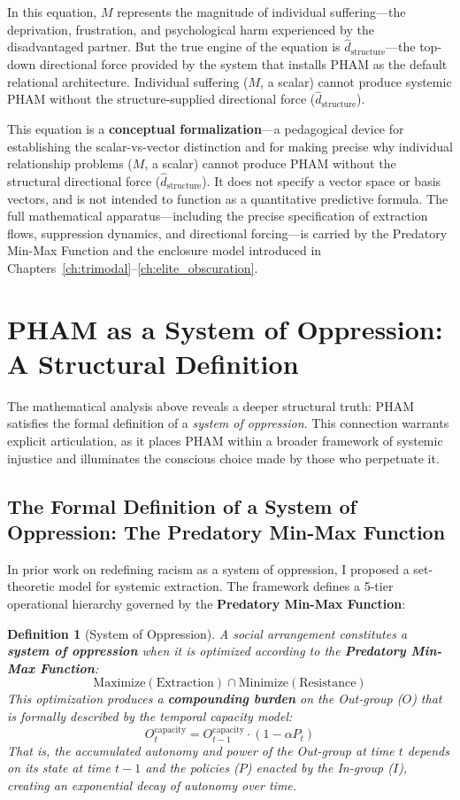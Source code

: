 \documentclass[12pt,openany]{book}
\newtheorem{definition}{Definition}[chapter]
\numberwithin{equation}{chapter}
\begin{document}
In this equation, $M$ represents the magnitude of individual suffering---the deprivation, frustration, and psychological harm experienced by the disadvantaged partner. But the true engine of the equation is $\hat{d}_{\text{structure}}$---the top-down directional force provided by the system that installs PHAM as the default relational architecture. Individual suffering ($M$, a scalar) cannot produce systemic PHAM without the structure-supplied directional force ($\hat{d}_{\text{structure}}$).

This equation is a \textbf{conceptual formalization}---a pedagogical device for establishing the scalar-vs-vector distinction and for making precise why individual relationship problems ($M$, a scalar) cannot produce PHAM without the structural directional force ($\hat{d}_{\text{structure}}$). It does not specify a vector space or basis vectors, and is not intended to function as a quantitative predictive formula. The full mathematical apparatus---including the precise specification of extraction flows, suppression dynamics, and directional forcing---is carried by the Predatory Min-Max Function and the enclosure model introduced in Chapters~\ref{ch:trimodal}--\ref{ch:elite_obscuration}.

\section{PHAM as a System of Oppression: A Structural Definition}

The mathematical analysis above reveals a deeper structural truth: PHAM satisfies the formal definition of a \textit{system of oppression}. This connection warrants explicit articulation, as it places PHAM within a broader framework of systemic injustice and illuminates the conscious choice made by those who perpetuate it.

\subsection{The Formal Definition of a System of Oppression: The Predatory Min-Max Function}

In prior work on redefining racism as a system of oppression, I proposed a set-theoretic model for systemic extraction. The framework defines a 5-tier operational hierarchy governed by the \textbf{Predatory Min-Max Function}:

\begin{definition}[System of Oppression]
A social arrangement constitutes a \textbf{system of oppression} when it is optimized according to the \textbf{Predatory Min-Max Function}:
\[
\text{Maximize}(\text{Extraction}) \cap \text{Minimize}(\text{Resistance})
\]
This optimization produces a \textbf{compounding burden} on the Out-group ($O$) that is formally described by the temporal capacity model:
\[
O_t^{\text{capacity}} = O_{t-1}^{\text{capacity}} \cdot (1 - \alpha P_t)
\]
That is, the accumulated autonomy and power of the Out-group at time $t$ depends on its state at time $t-1$ and the policies ($P$) enacted by the In-group ($I$), creating an exponential decay of autonomy over time.
\end{definition}
\end{document}
